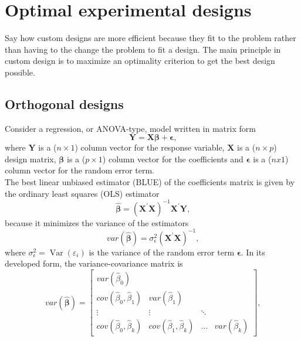 
\section{Optimal experimental designs}
\begin{formal}
Say how custom designs are more efficient because they fit to the problem rather than having to the change the problem to fit a design.
The main principle in custom design is to maximize an optimality criterion to get the best design possible.
\end{formal}


\subsection{Orthogonal designs}
Consider a regression, or ANOVA-type, model written in matrix form  
\begin{equation}
    \mathbf{Y} = \bm{X\beta} + \bm{\epsilon} \text{,}
\end{equation} 
where $\mathbf{Y}$ is a ($n \times 1$) column vector for the response variable, $\mathbf{X}$ is a ($n \times p$) design matrix, $\bm{\beta}$ is a ($p \times 1$) column vector for the coefficients and $\bm{\epsilon}$ is a ($nx1$) column vector for the random error term.\\
The best linear unbiased estimator (BLUE) of the coefficients matrix is given by the ordinary least squares (OLS) estimator
\begin{equation}
    \hat{\bm{\beta}} = (\mathbf{X}^{\prime} \mathbf{X})^{-1}\mathbf{X}^{\prime} \mathbf{Y} \text{,}
\end{equation} 
because it minimizes the variance of the estimators
\begin{equation} \label{eq:var_coef_mat_unexpanded}
    var(\hat{\bm{\beta}}) = \sigma_{\epsilon}^2(\mathbf{X}^{\prime}
\mathbf{X})^{-1} \text{,}
\end{equation}
where $\sigma_{\epsilon}^2 = \operatorname{Var}\left(\varepsilon_{i}\right)$ is the variance of the random error term $\mathbf{\epsilon}$. 
In its developed form, the variance-covariance matrix is
\begin{equation}
    var(\hat{\bm{\beta}}) =
\begin{bmatrix}
var(\hat{\beta}_0) &  &  &  \\ 
cov(\hat{\beta}_0,\hat{\beta}_1) & var(\hat{\beta}_1) &  &  \\ 
\vdots & \vdots & \ddots & \\ 
cov(\hat{\beta}_0,\hat{\beta}_k) & cov(\hat{\beta}_1,\hat{\beta}_k) & \dots & var(\hat{\beta}_k)
\end{bmatrix} 
\text{,}
\label{eq:var_cov_mat}
\end{equation}
